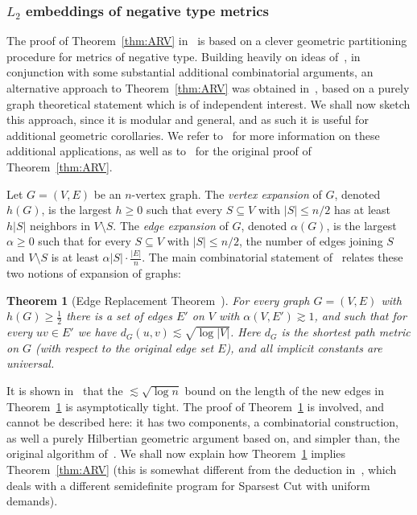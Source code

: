 \documentclass{icm2010}
\newtheorem{theorem}{Theorem}[section]
\theoremstyle{definition}
\newcommand{\1}{\mathbf{1}}
\renewcommand{\le}{\leqslant}
\renewcommand{\ge}{\geqslant}
\begin{document}
\subsubsection{$L_2$ embeddings of negative type metrics} The proof of Theorem~\ref{thm:ARV} in~\cite{ARV04} is based
on a clever geometric partitioning procedure for metrics of negative
type. Building heavily on ideas of~\cite{ARV04}, in conjunction with
some substantial additional combinatorial arguments, an alternative
approach to Theorem~\ref{thm:ARV} was obtained in~\cite{NRS05},
based on a purely graph theoretical statement which is of
independent interest. We shall now sketch this approach, since it is
modular and general, and as such it is useful for additional
geometric corollaries. %
We refer to~\cite{NRS05} for more information on these
additional applications, as well as to~\cite{ARV04} for the original
proof of Theorem~\ref{thm:ARV}.

Let $G=(V,E)$ be an $n$-vertex graph. The {\em vertex expansion} of $G$, denoted $h(G)$, is the largest $h\ge 0$ such that every $S\subseteq V$ with $|S|\le n/2$ has at least $h|S|$ neighbors in $V\setminus S$. The {\em edge expansion} of $G$, denoted $\alpha(G)$, is the largest  $\alpha\ge 0$ such that for every $S\subseteq V$ with $|S|\le n/2$, the number of edges joining $S$ and $V\setminus S$ is at least $\alpha|S|\cdot\frac{|E|}{n}$. The main combinatorial statement of~\cite{NRS05} relates these two notions of expansion of graphs:

\begin{theorem}[Edge Replacement Theorem~\cite{NRS05}]\label{thm:replace}
For every graph $G=(V,E)$ with $h(G)\ge \frac12$ there is a set of
edges $E'$ on $V$ with $\alpha(V,E')\gtrsim 1$, and such that for
every $uv\in E'$ we have $d_G(u,v)\lesssim \sqrt{\log |V|}$. Here
$d_G$ is the shortest path metric on $G$ (with respect to the
original edge set $E$), and all implicit constants are universal.
\end{theorem}

It is shown in~\cite{NRS05} that the $\lesssim \sqrt{\log n}$ bound on the length of the new edges in Theorem~\ref{thm:replace} is asymptotically tight. The proof of Theorem~\ref{thm:replace} is involved, and cannot be described here: it has two components, a combinatorial construction, as well a purely Hilbertian geometric argument based on, and simpler than, the original algorithm of~\cite{ARV04}. We shall now explain how Theorem~\ref{thm:replace} implies Theorem~\ref{thm:ARV} (this is somewhat different from the deduction in~\cite{NRS05}, which deals with a different semidefinite program for Sparsest Cut with uniform demands).
\end{document}

